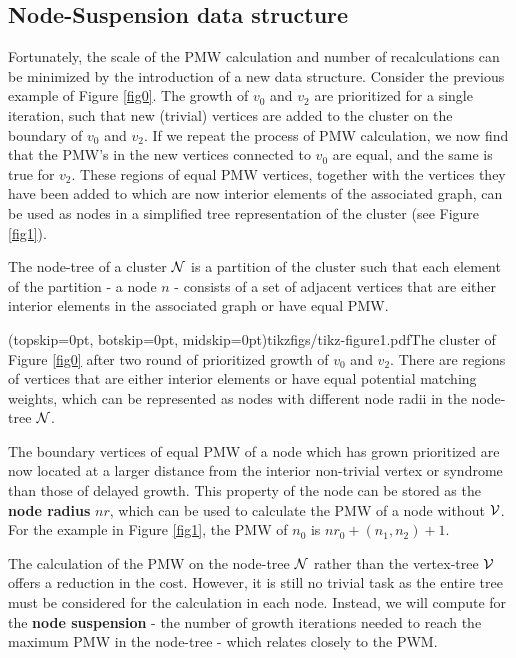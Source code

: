 \subsection{Node-Suspension data structure}\label{sec:nodeset}

Fortunately, the scale of the PMW calculation and number of recalculations can be minimized by the introduction of a new data structure. 
Consider the previous example of Figure \ref{fig0}. The growth of $v_0$ and $v_2$ are prioritized for a single iteration, such that new (trivial) vertices are added to the cluster on the boundary of $v_0$ and $v_2$. If we repeat the process of PMW calculation, we now find that the PMW's in the new vertices connected to $v_0$ are equal, and the same is true for $v_2$. These regions of equal PMW vertices, together with the vertices they have been added to which are now interior elements of the associated graph, can be used as nodes in a simplified tree representation of the cluster (see Figure \ref{fig1}). 

\begin{definition}
  The node-tree of a cluster $\mathcal{N}$ is a partition of the cluster such that each element of the partition - a node $n$ - consists of a set of adjacent vertices that are either interior elements in the associated graph or have equal PMW. 
\end{definition}

\Figure[htb](topskip=0pt, botskip=0pt, midskip=0pt){tikzfigs/tikz-figure1.pdf}{The cluster of Figure \ref{fig0} after two round of prioritized growth of $v_0$ and $v_2$. There are regions of vertices that are either interior elements or have equal potential matching weights, which can be represented as nodes with different node radii in the node-tree $\mathcal{N}$. \label{fig1}}

The boundary vertices of equal PMW of a node which has grown prioritized are now located at a larger distance from the interior non-trivial vertex or syndrome than those of delayed growth. This property of the node can be stored as the \textbf{node radius} $nr$, which can be used to calculate the PMW of a node without $\mathcal{V}$. For the example in Figure \ref{fig1}, the PMW of $n_0$ is $nr_0 + (n_1, n_2) + 1$.

The calculation of the PMW on the node-tree $\mathcal{N}$ rather than the vertex-tree $\mathcal{V}$ offers a reduction in the cost. However, it is still no trivial task as the entire tree must be considered for the calculation in each node. Instead, we will compute for the \textbf{node suspension} - the number of growth iterations needed to reach the maximum PMW in the node-tree - which relates closely to the PWM. 

